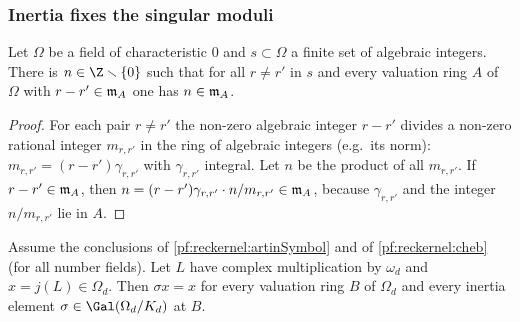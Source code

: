 \subsubsection{Inertia fixes the singular moduli}

\begin{lemma}\label{pf:reckernel:sepInt}
Let $\Omega$ be a field of characteristic $0$ and $s\subset\Omega$ a finite set of algebraic integers. There is
$n\in\Z\smallsetminus\{0\}$ such that for all $r\ne r'$ in $s$ and every valuation ring $A$ of $\Omega$ with
$r-r'\in\mathfrak{m}_A$ one has $n\in\mathfrak{m}_A$.
\end{lemma}

\begin{proof}
For each pair $r\ne r'$ the non-zero algebraic integer $r-r'$ divides a non-zero rational integer $m_{r,r'}$ in the
ring of algebraic integers (e.g.\ its norm): $m_{r,r'}=(r-r')\gamma_{r,r'}$ with $\gamma_{r,r'}$ integral. Let $n$ be
the product of all $m_{r,r'}$. If $r-r'\in\mathfrak{m}_A$, then $n=(r-r')\gamma_{r,r'}\cdot n/m_{r,r'}\in\mathfrak{m}_A$, because
$\gamma_{r,r'}$ and the integer $n/m_{r,r'}$ lie in $A$.
\end{proof}

\begin{theorem}\label{pf:reckernel:inertiaFixes}
Assume the conclusions of \cref{pf:reckernel:artinSymbol} and of \cref{pf:reckernel:cheb} (for all number fields).
Let $L$ have complex multiplication by $\omega_d$ and $x=j(L)\in\Omega_d$. Then $\sigma x=x$ for every valuation
ring $B$ of $\Omega_d$ and every inertia element $\sigma\in\Gal(\Omega_d/K_d)$ at $B$.
\end{theorem}

